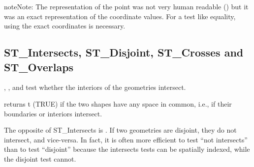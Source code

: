 \documentclass[a4paper,11pt,english]{sphinxmanual}
\begin{document}
\begin{sphinxVerbatim}[commandchars=\\\{\}]
 
\end{sphinxVerbatim}

\begin{sphinxadmonition}{note}{Note:}
The representation of the point was not very human readable () but it was an exact representation of the coordinate values. For a test like equality, using the exact coordinates is necessary.
\end{sphinxadmonition}


\subsection{ST\_Intersects, ST\_Disjoint, ST\_Crosses and ST\_Overlaps}
\label{\detokenize{basic:st-intersects-st-disjoint-st-crosses-and-st-overlaps}}
, , and  test whether the interiors of the geometries intersect.

\begin{figure}[htbp]
\centering

\noindent{}
\end{figure}

 returns t (TRUE) if the two shapes have any space in common, i.e., if their boundaries or interiors intersect.

\begin{figure}[htbp]
\centering

\noindent{}
\end{figure}

The opposite of ST\_Intersects is . If two geometries are disjoint, they do not intersect, and vice-versa. In fact, it is often more efficient to test “not intersects” than to test “disjoint” because the intersects tests can be spatially indexed, while the disjoint test cannot.

\begin{figure}[htbp]
\centering

\noindent{}
\end{figure}
\end{document}
